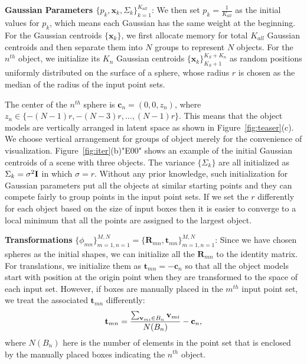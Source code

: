 \noindent\textbf{Gaussian Parameters $\{p_k,\mathbf{x}_k,\Sigma_k\}_{k=1}^{K_{all}}$}:
We then set $p_k=\frac{1}{K_{all}}$ as the initial values for $p_k$, which means each Gaussian has the same weight at the beginning. 
%
For the Gaussian centroids $\{\mathbf{x}_k\}$, we first allocate memory for total $K_{all}$ Gaussian centroids and then separate them into $N$ groups to represent $N$ objects. 
For the $n^{th}$ object, we initialize its $K_n$ Gaussian centroids $\{\mathbf{x}_k\}_{K_S+1}^{K_S+K_n}$ as random positions uniformly distributed on the surface of a sphere, whose radius $r$ is chosen as the median of the radius of the input point sets.
%
 
%
The center of the $n^{th}$ sphere is $\mathbf{c}_n=(0,0,z_n)$, where $z_n\in \{-(N-1)r,-(N-3)r,...,(N-1)r\}$.
%
This means that the object models are vertically arranged in latent space as shown in Figure~\ref{fig:teaser}(c). 
%
We choose vertical arrangement for groups of object merely for the convenience of visualization.
%
Figure~\ref{fig:iter}(b)"E00" shows an example of the initial Gaussian centroids of a scene with three objects.
%
The variance $\{\Sigma_k\}$ are all initialized as $\Sigma_k=\sigma^2 \mathbf{I}$ in which $\sigma=r$.
Without any prior knowledge, such initialization for Gaussian parameters put all the objects at similar starting points and they can compete fairly to group points in the input point sets. If we set the $r$ differently for each object based on the size of input boxes then it is easier to converge to a local minimum that all the points are assigned to the largest object.

\noindent\textbf{Transformations} $\{\phi_{mn}\}_{m=1,n=1}^{M,N}=\{\mathbf{R}_{mn},\mathbf{t}_{mn}\}_{m=1,n=1}^{M,N}$:
Since we have chosen spheres as the initial shapes, we can initialize all the $\mathbf{R}_{mn}$ to the identity matrix.
%
%
For translations, we initialize them as $\mathbf{t}_{mn}=- \mathbf{c}_n$ so that all the object models start with position at the origin point when they are transformed to the space of each input set. 
%
However, if boxes are manually placed in the $m^{th}$ input point set, we treat the associated $\mathbf{t}_{mn}$ differently:
%
\begin{equation}
	\label{equ:initt}
	\mathbf{t}_{mn}=\frac{\sum_{\mathbf{v}_{mi} \in B_n}\mathbf{v}_{mi}}{N(B_n)}-\mathbf{c}_n, 
\end{equation}
where $N(B_n)$ here is the number of elements in the point set that is enclosed by the manually placed boxes indicating the $n^{th}$ object.



